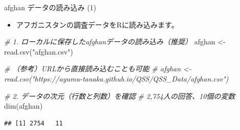 \documentclass[
  ignorenonframetext,
]{beamer}
\newenvironment{Shaded}{\begin{snugshade}}{\end{snugshade}}
\newcommand{\CommentTok}[1]{\textcolor[rgb]{0.56,0.35,0.01}{\textit{#1}}}
\newcommand{\FunctionTok}[1]{\textcolor[rgb]{0.00,0.00,0.00}{#1}}
\newcommand{\NormalTok}[1]{#1}
\newcommand{\OtherTok}[1]{\textcolor[rgb]{0.56,0.35,0.01}{#1}}
\newcommand{\StringTok}[1]{\textcolor[rgb]{0.31,0.60,0.02}{#1}}
\providecommand{\tightlist}{%
  \setlength{\itemsep}{0pt}\setlength{\parskip}{0pt}}
\begin{document}
\begin{frame}[fragile]{afghan データの読み込み (1)}
\protect\hypertarget{afghan-ux30c7ux30fcux30bfux306eux8aadux307fux8fbcux307f-1}{}
\begin{itemize}
\tightlist
\item
  アフガニスタンの調査データをRに読み込みます。
\end{itemize}

\scriptsize

\begin{Shaded}
\begin{Highlighting}[]
\CommentTok{\# 1. ローカルに保存したafghanデータの読み込み（推奨）}
\NormalTok{afghan }\OtherTok{\textless{}{-}} \FunctionTok{read.csv}\NormalTok{(}\StringTok{"afghan.csv"}\NormalTok{)}

\CommentTok{\# （参考）URLから直接読み込むことも可能}
\CommentTok{\# afghan \textless{}{-} read.csv("https://ayumu{-}tanaka.github.io/QSS/QSS\_Data/afghan.csv")}

\CommentTok{\# 2. データの次元（行数と列数）を確認}
\CommentTok{\# 2,754人の回答、10個の変数}
\FunctionTok{dim}\NormalTok{(afghan)}
\end{Highlighting}
\end{Shaded}

\begin{verbatim}
## [1] 2754   11
\end{verbatim}

\normalsize
\end{frame}
\end{document}

